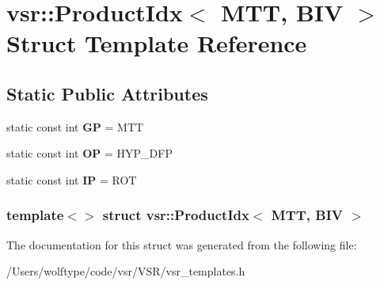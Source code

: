 \hypertarget{structvsr_1_1_product_idx_3_01_m_t_t_00_01_b_i_v_01_4}{\section{vsr\-:\-:Product\-Idx$<$ M\-T\-T, B\-I\-V $>$ Struct Template Reference}
\label{structvsr_1_1_product_idx_3_01_m_t_t_00_01_b_i_v_01_4}
}
\subsection*{Static Public Attributes}
\begin{DoxyCompactItemize}
\item 
\hypertarget{structvsr_1_1_product_idx_3_01_m_t_t_00_01_b_i_v_01_4_a3ea91b9bcac96b3acb3e88eda78dbac1}{static const int {\bfseries G\-P} = M\-T\-T}\label{structvsr_1_1_product_idx_3_01_m_t_t_00_01_b_i_v_01_4_a3ea91b9bcac96b3acb3e88eda78dbac1}

\item 
\hypertarget{structvsr_1_1_product_idx_3_01_m_t_t_00_01_b_i_v_01_4_a060f84b68ece75b3286658d55ca9b6e7}{static const int {\bfseries O\-P} = H\-Y\-P\-\_\-\-D\-F\-P}\label{structvsr_1_1_product_idx_3_01_m_t_t_00_01_b_i_v_01_4_a060f84b68ece75b3286658d55ca9b6e7}

\item 
\hypertarget{structvsr_1_1_product_idx_3_01_m_t_t_00_01_b_i_v_01_4_a49c07807c3fb22ac7dd2156d35182376}{static const int {\bfseries I\-P} = R\-O\-T}\label{structvsr_1_1_product_idx_3_01_m_t_t_00_01_b_i_v_01_4_a49c07807c3fb22ac7dd2156d35182376}

\end{DoxyCompactItemize}
\subsubsection*{template$<$$>$ struct vsr\-::\-Product\-Idx$<$ M\-T\-T, B\-I\-V $>$}



The documentation for this struct was generated from the following file\-:\begin{DoxyCompactItemize}
\item 
/\-Users/wolftype/code/vsr/\-V\-S\-R/vsr\-\_\-templates.\-h\end{DoxyCompactItemize}
